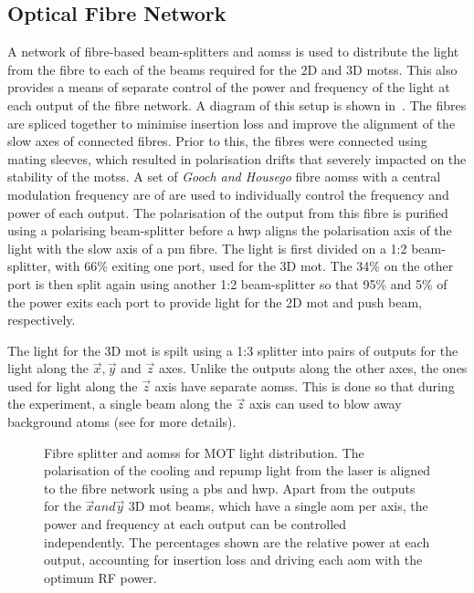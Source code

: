 \subsection{Optical Fibre Network}
A network of fibre-based beam-splitters and \acp{aoms} is used to distribute the
light from the \Muquans fibre to each of the beams required for the 2D and 3D
\acp{mots}. This also provides a means of separate control of the power and
frequency of the light at each output of the fibre network. A diagram of this
setup is shown in~. The fibres are spliced together
to minimise insertion loss and improve the alignment of the slow axes of
connected fibres. Prior to this, the fibres were connected using mating sleeves,
which resulted in polarisation drifts that severely impacted on the stability of
the \acp{mots}. A set of \textit{Gooch and Housego} fibre \acp{aoms} with a central modulation frequency are of  are used to individually control the frequency and power of each output. The polarisation
of the output from this fibre is purified using a polarising beam-splitter
before a \ac{hwp} aligns the polarisation axis of the light with the slow axis
of a \ac{pm} fibre. The light is first divided on a 1:2 beam-splitter, with 66\%
exiting one port, used for the 3D \ac{mot}. The 34\% on the other port is then
split again using another 1:2 beam-splitter so that 95\% and 5\% of the power
exits each port to provide light for the 2D \ac{mot} and push beam,
respectively.
\par\noindent The light for the 3D \ac{mot} is spilt using a 1:3 splitter into
pairs of outputs for the light along the \(\vec{x},\vec{y}\) and \(\vec{z}\)
axes. Unlike the outputs along the other axes, the ones used for light along the
\(\vec{z}\) axis have separate \acp{aoms}. This is done so that during the experiment, a single beam along the \(\vec{z}\) axis can used
to blow away background atoms (see  for
more details).

\begin{figure}
	\centering
	\def\svgwidth{0.5\textwidth}
	\small{}
	\caption[Network of optical fibre splitters and \acp{aoms} for \ac{MOT}light distribution]{Fibre splitter and \acp{aoms} for \ac{MOT} light distribution. The polarisation of the cooling and repump light from the \Muquans laser is aligned to the fibre network using a \ac{pbs} and \ac{hwp}. Apart from the outputs for the \(\vec{x} and \vec{y}\) 3D \ac{mot} beams, which have a single \ac{aom} per axis, the power and frequency at each output can be controlled independently. The percentages shown are the relative power at each output, accounting for insertion loss and driving each \ac{aom} with the optimum RF power.}
	\label{fig:fibre_network}
\end{figure}
